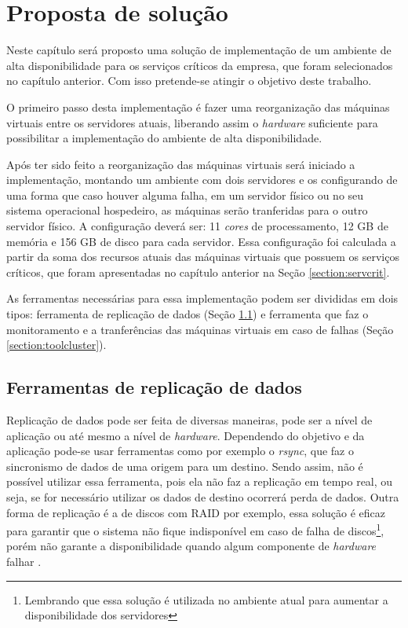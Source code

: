 \chapter{Proposta de solução}
\label{cap:propostadesolucao}

Neste capítulo será proposto uma solução de implementação de um ambiente de alta disponibilidade para os serviços críticos da empresa, que 
foram selecionados no capítulo anterior. Com isso pretende-se atingir o objetivo deste trabalho.

O primeiro passo desta implementação é fazer uma reorganização das máquinas virtuais entre os servidores atuais, liberando assim o 
\textit{hardware} suficiente para possibilitar a implementação do ambiente de alta disponibilidade. 

Após ter sido feito a reorganização das máquinas virtuais será iniciado a implementação, montando um ambiente com dois servidores e os 
configurando de uma forma que caso houver alguma falha, em um servidor físico ou no seu sistema operacional hospedeiro, as máquinas serão 
tranferidas para o outro servidor físico. 
A configuração deverá ser: 11 \textit{cores} de processamento, 12 GB de memória e 156 GB de disco para cada servidor. Essa configuração foi 
calculada a partir da soma dos recursos atuais das máquinas virtuais que possuem os serviços críticos, que foram apresentadas no capítulo
anterior na Seção \ref{section:servcrit}.

As ferramentas necessárias para essa implementação podem ser divididas em dois tipos: ferramenta de replicação de dados 
(Seção \ref{section:toolrepl}) e ferramenta que faz o monitoramento e a tranferências das máquinas virtuais em caso de falhas 
(Seção \ref{section:toolcluster}).

\section{Ferramentas de replicação de dados}
\label{section:toolrepl}

Replicação de dados pode ser feita de diversas maneiras, pode ser a nível de aplicação ou até mesmo a nível de \textit{hardware}.
Dependendo do objetivo e da aplicação pode-se usar ferramentas como por exemplo o \textit{rsync}, que faz o sincronismo de dados de uma origem
para um destino. Sendo assim, não é possível utilizar essa ferramenta, pois ela não faz a replicação em tempo real, ou seja, se for necessário
utilizar os dados de destino ocorrerá perda de dados. Outra forma de replicação é a de discos com \ac{RAID} por exemplo, essa solução é eficaz
para garantir que o sistema não fique indisponível em caso de falha de discos\footnote{Lembrando que essa solução é utilizada no ambiente atual
para aumentar a disponibilidade dos servidores}, porém não garante a disponibilidade quando algum componente de \textit{hardware} falhar 
\cite{zaminhani2008}.

